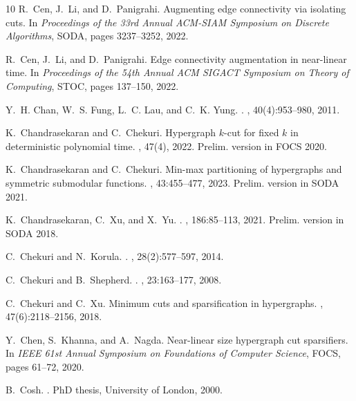 \documentclass{article}
\begin{document}
\begin{thebibliography}{10}
R.~Cen, J.~Li, and D.~Panigrahi.
\newblock Augmenting edge connectivity via isolating cuts.
\newblock In {\em Proceedings of the 33rd Annual ACM-SIAM Symposium on Discrete Algorithms}, SODA, pages 3237--3252, 2022.

R.~Cen, J.~Li, and D.~Panigrahi.
\newblock Edge connectivity augmentation in near-linear time.
\newblock In {\em Proceedings of the 54th Annual ACM SIGACT Symposium on Theory of Computing}, STOC, pages 137--150, 2022.

Y.~H. Chan, W.~S. Fung, L.~C. Lau, and C.~K. Yung.
.
, 40(4):953--980, 2011.

K.~Chandrasekaran and C.~Chekuri.
\newblock Hypergraph $k$-cut for fixed $k$ in deterministic polynomial time.
, 47(4), 2022.
\newblock Prelim. version in FOCS 2020.

K.~Chandrasekaran and C.~Chekuri.
\newblock Min-max partitioning of hypergraphs and symmetric submodular functions.
, 43:455--477, 2023.
\newblock Prelim. version in SODA 2021.

K.~Chandrasekaran, C.~Xu, and X.~Yu.
.
, 186:85--113, 2021.
\newblock Prelim. version in SODA 2018.

C.~Chekuri and N.~Korula.
.
, 28(2):577--597, 2014.

C.~Chekuri and B.~Shepherd.
.
, 23:163--177, 2008.

C.~Chekuri and C.~Xu.
\newblock Minimum cuts and sparsification in hypergraphs.
, 47(6):2118--2156, 2018.

Y.~Chen, S.~Khanna, and A.~Nagda.
\newblock Near-linear size hypergraph cut sparsifiers.
\newblock In {\em IEEE 61st Annual Symposium on Foundations of Computer Science}, FOCS, pages 61--72, 2020.

B.~Cosh.
.
\newblock PhD thesis, {University of London}, 2000.


\end{thebibliography}
\end{document}
